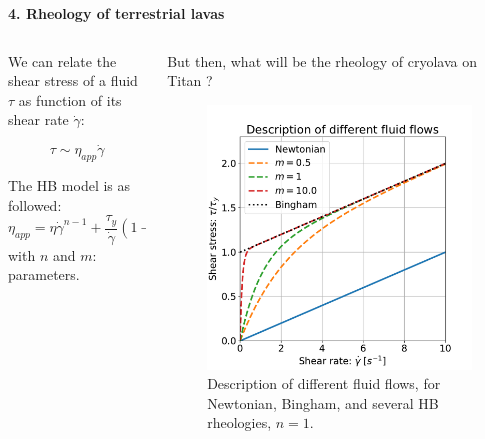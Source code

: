 \documentclass[final,t]{beamer}
\begin{document}
\begin{frame}
\begin{columns}[t]
\begin{column}{.495\linewidth}
\begin{block}{\textbf{4. Rheology of terrestrial lavas}}
\begin{columns}
\begin{column}{0.49\textwidth}
  We can relate the shear stress of a fluid $\tau$ as function of its shear rate $\dot \gamma$:
  
  \begin{equation}
  	\tau \sim \eta_{app} \dot \gamma
  \end{equation}
  
  	The HB model is as followed:
  	\begin{equation}
  		\eta_{app} = \eta \dot \gamma^{n-1} + \frac{\tau_y}{\dot \gamma}\left(1-e^{-m \dot \gamma}\right)
  		\label{eq:HBmodel}
  	\end{equation}
  	with $n$ and $m$: parameters.
  \end{column}
  \begin{column}{0.49\textwidth}
  	But then, what will be the rheology of cryolava on Titan ?\vspace{-1cm}
  	\begin{figure}[h]
  		\centering
  		\includegraphics[scale=1.2]{Python_Figures/ShearStress_ShearRate.pdf} 
  		\caption{Description of different fluid flows, for Newtonian, Bingham, and several HB rheologies, $n=1$.}
  		\label{fig:ModelsDescription}
  	\end{figure}
  \end{column}
  \end{columns}\vspace{5pt}
  

\end{block}
\end{column}
\end{columns}
\end{frame}
\end{document}
